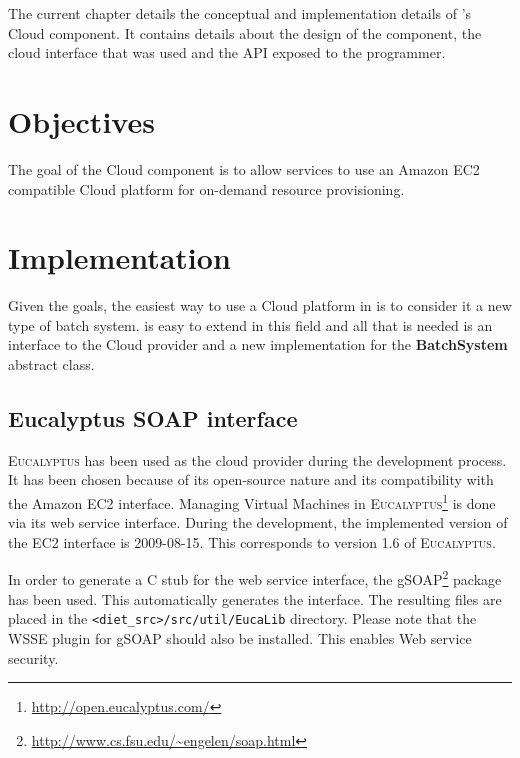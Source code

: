 
The current chapter details the conceptual and implementation details of \diet's Cloud
component. It contains details about the design of the component, the cloud interface
that was used and the API exposed to the \diet programmer.

\section{Objectives}

The goal of the Cloud component is to allow \diet services to use an Amazon EC2 compatible
Cloud platform for on-demand resource provisioning.

\section{Implementation}

Given the goals, the easiest way to use a Cloud platform in \diet is to consider it
a new type of batch system. \diet is easy to extend in this field and all that is needed
is an interface to the Cloud provider and a new implementation for the \textbf{BatchSystem}
abstract class.

\subsection{Eucalyptus SOAP interface}

\textsc{Eucalyptus} has been used as the cloud provider during the development process. It has
been chosen because of its open-source nature and its compatibility with the Amazon EC2 interface.
Managing Virtual Machines in \textsc{Eucalyptus}\footnote{\url{http://open.eucalyptus.com/}}
is done via its web service interface. During
the development, the implemented version of the EC2 interface is 2009-08-15. This corresponds to
version 1.6 of \textsc{Eucalyptus}.

In order to generate a C stub for the web service interface, the gSOAP\footnote{\url{http://www.cs.fsu.edu/~engelen/soap.html}}
package has been used. This automatically generates the interface. The resulting files
are placed in the \verb!<diet_src>/src/util/EucaLib! directory. Please note that the WSSE
plugin for gSOAP should also be installed. This enables Web service security.

